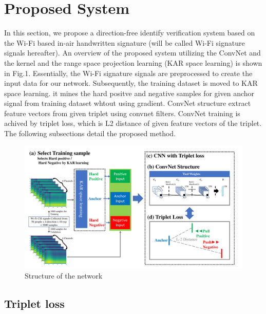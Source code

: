 \documentclass[runningheads]{llncs}
\begin{document}
\section{Proposed System}

In this section, we propose a direction-free identify verification system based on the Wi-Fi based in-air handwritten signature (will be called Wi-Fi signature signals hereafter). An overview of the proposed system utilizing the ConvNet \cite{lecun1998gradient} and the kernel and the range space projection learning (KAR space learning) is shown in Fig.1.
Essentially, the Wi-Fi signature signals are preprocessed to create the input data for our network. Subsequently, the training dataset is moved to KAR space learning. it mines the hard positve and negative samples for given anchor signal from training dataset whtout using gradient.
ConvNet structure extract feature vectors from given triplet using convnet filters.
ConvNet training is achived by triplet loss, which is L2 distance of given feature vectors of the triplet. 
The following subsections detail the proposed method.

\begin{figure}
    \includegraphics[width=\textwidth]{fig1_network_structure.pdf}
    \caption{Structure of the network} \label{fig1}
\end{figure}


\subsection{Triplet loss}
\end{document}
